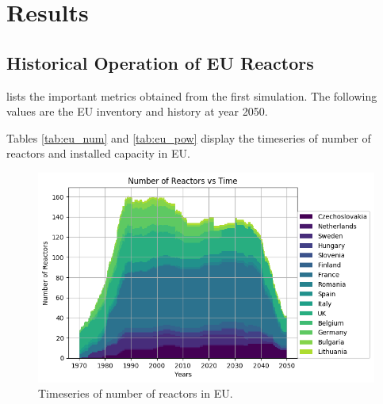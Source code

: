 \section{Results}

\subsection{Historical Operation of \gls{EU} Reactors}


\begin{table}[h]
	\centering
		\caption{Simulation Results}
		\label{tab:sim_result}
		\end {table}

 lists the important metrics
obtained from the first simulation. The following
values are the \gls{EU} inventory and history at year 2050.

Tables \ref{tab:eu_num} and \ref{tab:eu_pow} display the
timeseries of number of reactors and installed capacity in \gls{EU}.



\begin{figure}[htbp!]
	\begin{center}
		\includegraphics[width=\columnwidth]{./images/eu_future/number_plot.png}
	\end{center}
	\caption{Timeseries of number of reactors in \gls{EU}.}
	\label{fig:eu_num}
\end{figure}

